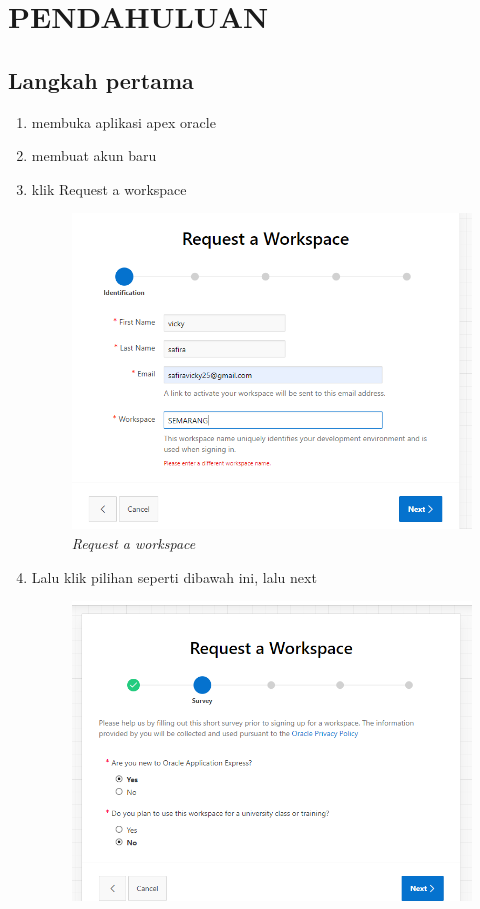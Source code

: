 \chapter{PENDAHULUAN}

\section{Langkah pertama}
\begin{enumerate}
    \item membuka aplikasi apex oracle
    \item membuat akun baru
    \item klik Request a workspace
\begin{figure}[!htbp]
    \centering
    \includegraphics[scale=0.5]{figure/21.PNG}
    \caption{\textit{Request a workspace}}
    \label{gambar 1}
\end{figure}
    \item Lalu klik pilihan seperti dibawah ini, lalu next 
\begin{figure}[!htbp]
    \centering
    \includegraphics[scale=0.5]{figure/2.PNG}

\end{figure}
\end{enumerate}
